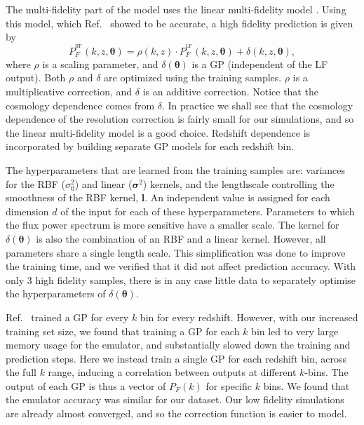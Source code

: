\documentclass[a4paper,11pt]{article}
\begin{document}
The multi-fidelity part of the model uses the linear multi-fidelity model \citep{10.1093/biomet/87.1.1}. Using this model, which Ref.~\cite{Fernandez:2022} showed to be accurate, a high fidelity prediction is given by
\begin{equation}
    P_F^{^\mathrm{HF}}(k, z, \boldsymbol{\theta}) = \rho(k, z) \cdot P_F^{^\mathrm{LF}}(k, z, \boldsymbol{\theta}) + \delta(k, z, \boldsymbol{\theta}),
    \label{eq:ko_model}
\end{equation}
where $\rho$ is a scaling parameter, and $\delta(\boldsymbol{\theta})$ is a GP (independent of the LF output). Both $\rho$ and $\delta$ are optimized using the training samples. $\rho$ is a multiplicative correction, and $\delta$ is an additive correction. Notice that the cosmology dependence comes from $\delta$. In practice we shall see that the cosmology dependence of the resolution correction is fairly small for our simulations, and so the linear multi-fidelity model is a good choice. Redshift dependence is incorporated by building separate GP models for each redshift bin.

The hyperparameters that are learned from the training samples are: variances for the RBF ($\sigma_0^2$) and  linear ($\boldsymbol{\sigma}^2$) kernels, and the lengthscale controlling the smoothness of the RBF kernel, $\boldsymbol{l}$. An independent value is assigned for each dimension $d$ of the input for each of these hyperparameters. Parameters to which the flux power spectrum is more sensitive have a smaller scale. The kernel for $\delta(\boldsymbol{\theta})$ is also the combination of an RBF and a linear kernel. However, all parameters share a single length scale. This simplification was done to improve the training time, and we verified that it did not affect prediction accuracy. With only $3$ high fidelity samples, there is in any case little data to separately optimise the hyperparameters of $\delta(\boldsymbol{\theta})$.

Ref.~\cite{Fernandez:2022} trained a GP for every $k$ bin for every redshift. However, with our increased training set size, we found that training a GP for each $k$ bin led to very large memory usage for the emulator, and substantially slowed down the training and prediction steps. Here we instead train a single GP for each redshift bin, across the full $k$ range, inducing a correlation between outputs at different $k$-bins.
The output of each GP is thus a vector of $P_F(k)$ for specific $k$ bins. We found that the emulator accuracy was similar for our dataset. Our low fidelity simulations are already almost converged, and so the correction function is easier to model.
\end{document}
